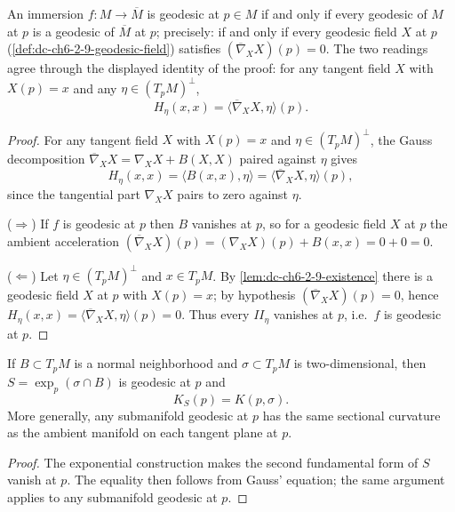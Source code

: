 \begin{proposition}
  \label{prop:dc-ch6-2-9}

  An immersion $f:M\to\overline{M}$ is geodesic at $p\in M$ if and only if every
  geodesic of $M$ at $p$ is a geodesic of $\overline{M}$ at $p$; precisely: if
  and only if every geodesic field $X$ at $p$
  (\cref{def:dc-ch6-2-9-geodesic-field}) satisfies
  $(\overline{\nabla}_X X)(p)=0$. The two readings agree through the displayed
  identity of the proof: for any tangent field $X$ with $X(p)=x$ and any
  $\eta\in(T_pM)^\perp$,
  $$
  H_\eta(x,x)=\langle\overline{\nabla}_X X,\eta\rangle(p).
  $$
\end{proposition}
\begin{proof}
  \sketch
  For any tangent field $X$ with $X(p)=x$ and $\eta\in(T_pM)^\perp$, the Gauss
  decomposition $\overline{\nabla}_X X=\nabla_X X+B(X,X)$ paired against $\eta$
  gives
  $$
  H_\eta(x,x)=\langle B(x,x),\eta\rangle=\langle\overline{\nabla}_X X,\eta\rangle(p),
  $$
  since the tangential part $\nabla_X X$ pairs to zero against $\eta$.

  ($\Rightarrow$) If $f$ is geodesic at $p$ then $B$ vanishes at $p$, so for a
  geodesic field $X$ at $p$ the ambient acceleration
  $(\overline{\nabla}_X X)(p)=(\nabla_X X)(p)+B(x,x)=0+0=0$.

  ($\Leftarrow$) Let $\eta\in(T_pM)^\perp$ and $x\in T_pM$. By
  \cref{lem:dc-ch6-2-9-existence} there is a geodesic field $X$ at $p$ with
  $X(p)=x$; by hypothesis $(\overline{\nabla}_X X)(p)=0$, hence
  $H_\eta(x,x)=\langle\overline{\nabla}_X X,\eta\rangle(p)=0$. Thus every
  $\mathit{II}_\eta$ vanishes at $p$, i.e.\ $f$ is geodesic at $p$.
\end{proof}

\begin{remark}
  \label{rem:dc-ch6-2-9-interpretation}


  If $B\subset T_pM$ is a normal neighborhood and $\sigma\subset T_pM$ is
  two-dimensional, then $S=\exp_p(\sigma\cap B)$ is geodesic at $p$ and
  $$
  K_S(p)=K(p,\sigma).
  $$
  More generally, any submanifold geodesic at $p$ has the same sectional
  curvature as the ambient manifold on each tangent plane at $p$.
\end{remark}
\begin{proof}
  \sketch
  The exponential construction makes the second fundamental form of $S$ vanish
  at $p$. The equality then follows from Gauss' equation; the same argument
  applies to any submanifold geodesic at $p$.
\end{proof}

